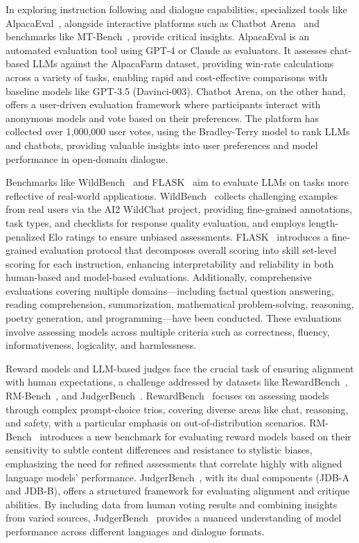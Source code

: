 In exploring instruction following and dialogue capabilities, specialized tools like AlpacaEval~\cite{dubois2024length}, alongside interactive platforms such as Chatbot Arena~\cite{zheng2023judging} and benchmarks like MT-Bench~\cite{zheng2023judging}, provide critical insights. AlpacaEval is an automated evaluation tool using GPT-4 or Claude as evaluators. It assesses chat-based LLMs against the AlpacaFarm dataset, providing win-rate calculations across a variety of tasks, enabling rapid and cost-effective comparisons with baseline models like GPT-3.5 (Davinci-003). Chatbot Arena, on the other hand, offers a user-driven evaluation framework where participants interact with anonymous models and vote based on their preferences. The platform has collected over 1,000,000 user votes, using the Bradley-Terry model to rank LLMs and chatbots, providing valuable insights into user preferences and model performance in open-domain dialogue.


Benchmarks like WildBench~\cite{lin2024wildbench} and FLASK~\cite{ye2023flask} aim to evaluate LLMs on tasks more reflective of real-world applications. WildBench~\cite{lin2024wildbench} collects challenging examples from real users via the AI2 WildChat project, providing fine-grained annotations, task types, and checklists for response quality evaluation, and employs length-penalized Elo ratings to ensure unbiased assessments. FLASK~\cite{ye2023flask} introduces a fine-grained evaluation protocol that decomposes overall scoring into skill set-level scoring for each instruction, enhancing interpretability and reliability in both human-based and model-based evaluations. Additionally, comprehensive evaluations covering multiple domains—including factual question answering, reading comprehension, summarization, mathematical problem-solving, reasoning, poetry generation, and programming—have been conducted. These evaluations involve assessing models across multiple criteria such as correctness, fluency, informativeness, logicality, and harmlessness.


Reward models and LLM-based judges face the crucial task of ensuring alignment with human expectations, a challenge addressed by datasets like RewardBench~\cite{lambert2024rewardbench}, RM-Bench~\cite{liu2024rm}, and JudgerBench~\cite{cao2024compassjudger}.
RewardBench~\cite{lambert2024rewardbench} focuses on assessing models through complex prompt-choice trios, covering diverse areas like chat, reasoning, and safety, with a particular emphasis on out-of-distribution scenarios.  RM-Bench~\cite{liu2024rm} introduces a new benchmark for evaluating reward models based on their sensitivity to subtle content differences and resistance to stylistic biases, emphasizing the need for refined assessments that correlate highly with aligned language models' performance.
JudgerBench~\cite{cao2024compassjudger}, with its dual components (JDB-A and JDB-B), offers a structured framework for evaluating alignment and critique abilities. By including data from human voting results and combining insights from varied sources, JudgerBench~\cite{cao2024compassjudger} provides a nuanced understanding of model performance across different languages and dialogue formats.


